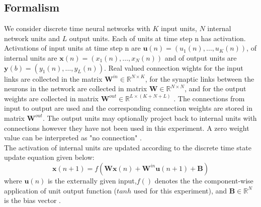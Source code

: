  
 
  \subsection{Formalism}
  We consider discrete time neural networks with $K$ input units, $N$ internal network units and $L$ output units. Each of units at time step n has activation. Activations of input units at time step n are $\mathbf{u}(n) = (u_1(n),\hdots,u_K(n))$, of internal units are $\mathbf{x}(n) =( x_1(n),\hdots,x_N(n) )$ and of output units are $\mathbf{y}(b) = (y_1(n),\hdots,y_L(n))$. Real valued connection wights for the input links are collected in the matrix $\mathbf{W}^{in} \in \mathbb{R}^{N \times K }$, for the synaptic links between the neurons in the network are collected in matrix $\mathbf{W} \in \mathbb{R}^{N \times N }$, and for the output weights are collected in matrix $\mathbf{W}^{out} \in \mathbb{R}^{L \times (K+N+L) }$ \cite{EchoStatesTechRep}. The connections from input to output are used and the corresponding connection weights are stored in matrix $\mathbf{W}^{out}$. The output units may optionally project back to internal units with connections however they have not been used in this experiment. A zero weight value can be interpreted as "no connection" \cite{aeger_TrainingRNNsTutorial.2005}. \\
  \indent \indent
  The activation of internal units are updated according to the discrete time state update equation given below:
   \begin{equation} \label{eq:stateUpdate}
    \textbf{x}(n+1) = f(\textbf{Wx}(n) +  \textbf{W}^{in}\textbf{u}(n+1) + \mathbf{B} )
  \end{equation}
   where $\mathbf{u}(n)$ is the externally given input,$f()$ denotes the the component-wise application of unit output function ($tanh$ used for this experiment), and $\mathbf{B} \in \mathbb{R}^N$ is the bias vector .
 

